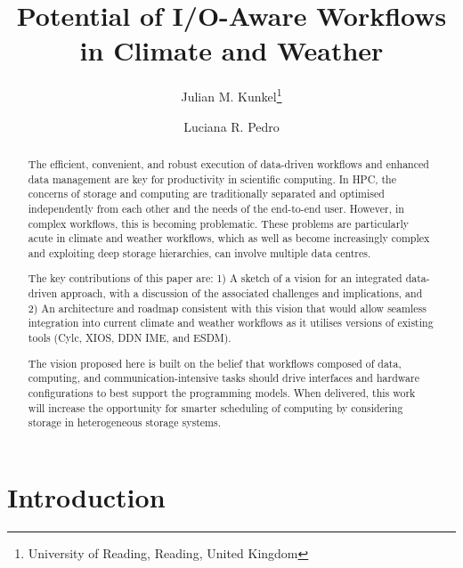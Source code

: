 \documentclass{superfri}
\begin{document}
\author{Julian M. Kunkel\footnote{\label{uread}University of Reading, Reading, United Kingdom} \and Luciana R. Pedro
}

\title{Potential of I/O-Aware Workflows in Climate and Weather}

\maketitle{}

\begin{abstract}
The efficient, convenient, and robust execution of data-driven workflows and enhanced data management are key for productivity in scientific computing.
In HPC, the concerns of storage and computing are traditionally separated and optimised independently from each other and the needs of the end-to-end user. However, in complex workflows, this is becoming problematic. These problems are particularly acute in climate and weather workflows, which as well as become increasingly complex and exploiting deep storage hierarchies, can involve multiple data centres.

The key contributions of this paper are:
1) A sketch of a vision for an integrated data-driven approach, with a discussion of the associated challenges and implications, and 2) An architecture and roadmap consistent with this vision that would allow seamless integration into current climate and weather workflows as it utilises versions of existing tools (Cylc, XIOS, DDN IME, and ESDM).

The vision proposed here is built on the belief that workflows composed of data, computing, and communication-intensive tasks should drive interfaces and hardware configurations to best support the programming models.
When delivered, this work will increase the opportunity for smarter scheduling of computing by considering storage in heterogeneous storage systems.

\end{abstract}


\section*{Introduction}
\label{sec:intro}
\end{document}
